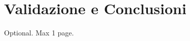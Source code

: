 \documentclass[12pt,a4paper,openright,twoside]{book}
\begin{document}
\chapter{Validazione e Conclusioni}
\label{chap:conclusioni}



\backmatter

\nocite{*} %




\begin{acknowledgements} %
Optional. Max 1 page.
\end{acknowledgements}
\end{document}
